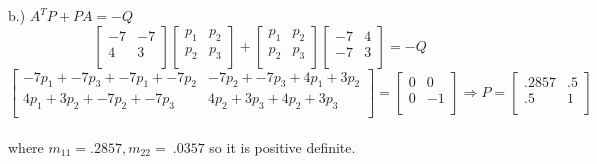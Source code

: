 \documentclass{homeworg}
\newcommand{\transpose}[1]{\ensuremath{#1^{\scriptscriptstyle T}}}
\begin{document}
b.) \(\transpose{A}P+PA=-Q \)
\begin{equation*}
\begin{bmatrix}
  -7 & -7\\
  4 & 3\\
\end{bmatrix}
\begin{bmatrix}
  p_1 & p_2\\
  p_2 & p_3\\
\end{bmatrix} +
\begin{bmatrix}
p_1 & p_2\\
p_2 & p_3\\
\end{bmatrix}
\begin{bmatrix}
  -7 & 4\\
  -7 & 3\\
\end{bmatrix} = -Q
\end{equation*}
\begin{equation*}
\begin{bmatrix}
    -7 p_1 + -7 p_3 + -7 p_1 + -7 p_2 & -7 p_2 + -7 p_3 + 4 p_1 + 3 p_2\\
    4 p_1 + 3 p_2 + -7 p_2 + -7 p_3 & 4 p_2 + 3 p_3 + 4 p_2 + 3 p_3\\
\end{bmatrix} =
\begin{bmatrix}
  0 & 0\\
  0 & -1\\
\end{bmatrix} \Rightarrow
P = \begin{bmatrix}
  .2857 & .5\\
  .5 & 1\\
\end{bmatrix}
\end{equation*}\\
where \(m_{11}= .2857, m_{22}= ~.0357\) so it is positive definite.\\
\end{document}
